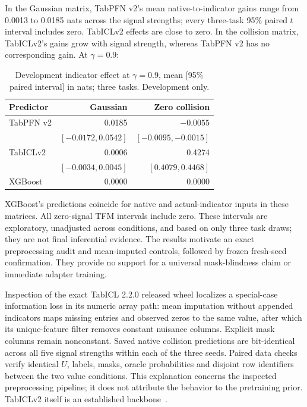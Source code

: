 \documentclass[10pt]{article}
\begin{document}
In the Gaussian matrix, TabPFN v2's mean native-to-indicator gains range from 0.0013 to 0.0185 nats across the signal strengths; every three-task 95\% paired $t$ interval includes zero. TabICLv2 effects are close to zero. In the collision matrix, TabICLv2's gains grow with signal strength, whereas TabPFN v2 has no corresponding gain. At $\gamma=0.9$:
\begin{table}[t]
\centering\small
\caption{Development indicator effect at $\gamma=0.9$, mean [95\% paired interval] in nats; three tasks. Development only.}
\begin{tabular}{@{}lrr@{}}\toprule
Predictor & Gaussian & Zero collision\\\midrule
TabPFN v2 & 0.0185 & $-0.0055$\\
 & $[-0.0172,0.0542]$ & $[-0.0095,-0.0015]$\\
TabICLv2 & 0.0006 & 0.4274\\
 & $[-0.0034,0.0045]$ & $[0.4079,0.4468]$\\
XGBoost & 0.0000 & 0.0000\\\bottomrule
\end{tabular}
\end{table}
XGBoost's predictions coincide for native and actual-indicator inputs in these matrices. All zero-signal TFM intervals include zero. These intervals are exploratory, unadjusted across conditions, and based on only three task draws; they are not final inferential evidence. The results motivate an exact preprocessing audit and mean-imputed controls, followed by frozen fresh-seed confirmation. They provide no support for a universal mask-blindness claim or immediate adapter training.

Inspection of the exact TabICL 2.2.0 released wheel localizes a special-case information loss in its numeric array path: mean imputation without appended indicators maps missing entries and observed zeros to the same value, after which its unique-feature filter removes constant nuisance columns. Explicit mask columns remain nonconstant. Saved native collision predictions are bit-identical across all five signal strengths within each of the three seeds. Paired data checks verify identical $U$, labels, masks, oracle probabilities and disjoint row identifiers between the two value conditions. This explanation concerns the inspected preprocessing pipeline; it does not attribute the behavior to the pretraining prior. TabICLv2 itself is an established backbone~\cite{qu2026}.
\end{document}
